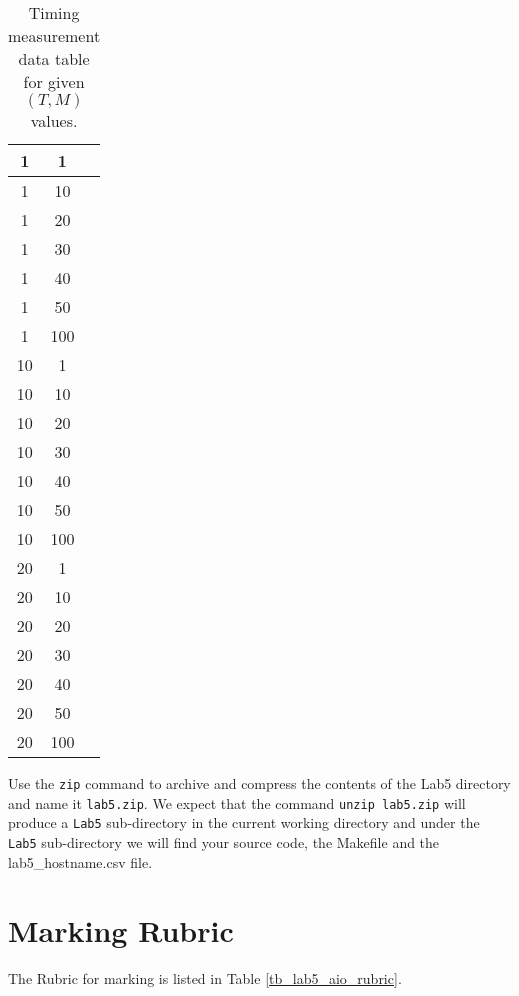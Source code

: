 \begin{enumerate}
\begin{table}[h]
\begin{center}
\begin{tabular}{|c|c|c|}
1 &    1 &    \\ \hline
1 &    10 &    \\ \hline
1 &    20 &    \\ \hline
1 &    30 &    \\ \hline
1 &    40 &    \\ \hline
1 &    50 &    \\ \hline
1 &    100 &    \\ \hline
10 &    1 &    \\ \hline
10 &    10 &    \\ \hline
10 &    20 &    \\ \hline
10 &    30 &    \\ \hline
10 &    40 &    \\ \hline
10 &    50 &    \\ \hline
10 &    100 &    \\ \hline
20 &    1 &    \\ \hline
20 &    10 &    \\ \hline
20 &    20 &    \\ \hline
20 &    30 &    \\ \hline
20 &    40 &    \\ \hline
20 &    50 &    \\ \hline
20 &    100 &    \\ \hline

\end{tabular}
\caption{Timing measurement data table for given $(T, M)$ values.}
\label{tb_timing_lab5}
\end{center}
\end{table}
\end{enumerate}
Use the \verb+zip+ command to archive and compress the contents of the Lab5 directory and name it \verb+lab5.zip+. We expect that the command \verb+unzip lab5.zip+ will produce a \verb+Lab5+ sub-directory in the current working directory and under the \verb+Lab5+ sub-directory we will find your source code, the Makefile and the lab5\_hostname.csv file.

\section{Marking Rubric}
The Rubric for marking is listed in Table \ref{tb_lab5_aio_rubric}.

